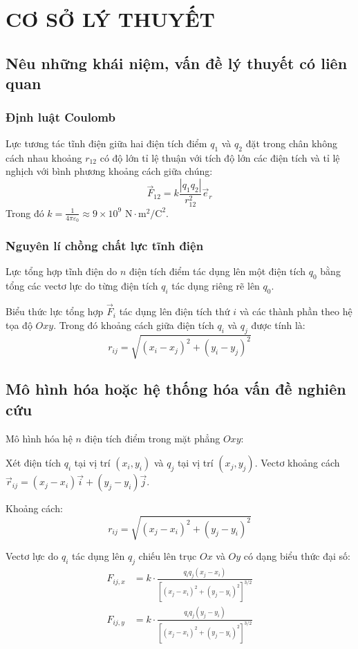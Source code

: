 \section{CƠ SỞ LÝ THUYẾT}

\subsection{Nêu những khái niệm, vấn đề lý thuyết có liên quan}

\subsubsection{Định luật Coulomb}
Lực tương tác tĩnh điện giữa hai điện tích điểm $q_1$ và $q_2$ đặt trong chân không cách nhau khoảng $r_{12}$ có độ lớn tỉ lệ thuận với tích độ lớn các điện tích và tỉ lệ nghịch với bình phương khoảng cách giữa chúng:
\[
\vec{F}_{12} = k \frac{|q_1 q_2|}{r_{12}^2} \vec{e}_r
\]
Trong đó $k = \frac{1}{4\pi\varepsilon_0} \approx 9 \times 10^9 \text{ N}\cdot\text{m}^2/\text{C}^2$.

\subsubsection{Nguyên lí chồng chất lực tĩnh điện}
Lực tổng hợp tĩnh điện do $n$ điện tích điểm tác dụng lên một điện tích $q_0$ bằng tổng các vectơ lực do từng điện tích $q_i$ tác dụng riêng rẽ lên $q_0$.

Biểu thức lực tổng hợp $\vec{F}_i$ tác dụng lên điện tích thứ $i$ và các thành phần theo hệ tọa độ $Oxy$. Trong đó khoảng cách giữa điện tích $q_i$ và $q_j$ được tính là:
\[
r_{ij} = \sqrt{(x_i - x_j)^2 + (y_i - y_j)^2}
\]

\subsection{Mô hình hóa hoặc hệ thống hóa vấn đề nghiên cứu}
Mô hình hóa hệ $n$ điện tích điểm trong mặt phẳng $Oxy$:

Xét điện tích $q_i$ tại vị trí $(x_i, y_i)$ và $q_j$ tại vị trí $(x_j, y_j)$. Vectơ khoảng cách $\vec{r}_{ij} = (x_j - x_i)\vec{i} + (y_j - y_i)\vec{j}$.

Khoảng cách:
\[
r_{ij} = \sqrt{(x_j - x_i)^2 + (y_j - y_i)^2}
\]

Vectơ lực do $q_i$ tác dụng lên $q_j$ chiếu lên trục $Ox$ và $Oy$ có dạng biểu thức đại số:
\begin{align*}
F_{ij,x} &= k \cdot \frac{q_i q_j (x_j - x_i)}{\left[(x_j - x_i)^2 + (y_j - y_i)^2\right]^{3/2}} \\
F_{ij,y} &= k \cdot \frac{q_i q_j (y_j - y_i)}{\left[(x_j - x_i)^2 + (y_j - y_i)^2\right]^{3/2}}
\end{align*}

